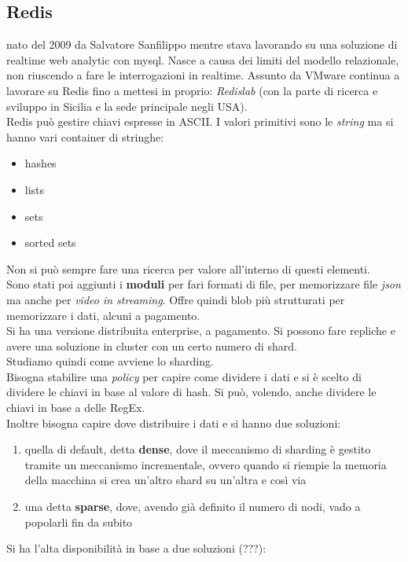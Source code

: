\documentclass[a4paper,12pt, oneside]{book}
\begin{document}
\subsection{Redis}
nato del 2009 da Salvatore Sanfilippo mentre stava lavorando su una soluzione di
realtime web analytic con mysql. Nasce a causa dei limiti del modello
relazionale, non riuscendo a fare le interrogazioni in realtime. Assunto da
VMware continua a lavorare su Redis fino a mettesi in proprio:
\textit{Redislab} (con la parte di ricerca e sviluppo in Sicilia e la sede
principale negli USA).\\
Redis può gestire chiavi espresse in ASCII. I valori primitivi sono le
\textit{string} ma si hanno vari container di stringhe:
\begin{itemize}
  \item hashes
  \item lists
  \item sets
  \item sorted sets
\end{itemize}
Non si può sempre fare una ricerca per valore all'interno di questi elementi.\\
Sono stati poi aggiunti i \textbf{moduli} per fari formati di file, per
memorizzare file \textit{json} ma anche per \textit{video in streaming}. Offre
quindi blob più strutturati per memorizzare i dati, alcuni a pagamento.\\
Si ha una versione distribuita enterprise, a pagamento. Si possono fare repliche
e avere una soluzione in cluster con un certo numero di shard.\\
Studiamo quindi come avviene lo sharding.\\
Bisogna stabilire una \textit{policy} per capire come dividere i dati e si è
scelto di dividere le chiavi in base al valore di hash. Si può, volendo, anche
dividere le chiavi in base a delle RegEx.\\
Inoltre bisogna capire dove distribuire i dati e si hanno due soluzioni:
\begin{enumerate}
  \item quella di default, detta \textbf{dense}, dove il meccanismo di sharding
  è gestito tramite un meccanismo incrementale, ovvero quando si riempie la
  memoria della macchina si crea un'altro shard su un'altra e così via
  \item una detta \textbf{sparse}, dove, avendo già definito il numero di nodi,
  vado a popolarli fin da subito
\end{enumerate}
Si ha l'alta disponibilità in base a due soluzioni (???):
\end{document}
